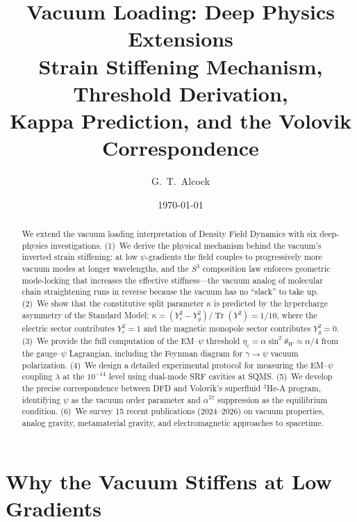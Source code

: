 \documentclass[aps,prd,twocolumn,superscriptaddress,nofootinbib]{revtex4-2}
\newcommand{\Tr}{\operatorname{Tr}}
\begin{document}
\title{Vacuum Loading: Deep Physics Extensions\\
Strain Stiffening Mechanism, Threshold Derivation,\\
Kappa Prediction, and the Volovik Correspondence}

\author{G.~T.~Alcock}

\date{\today}

\begin{abstract}
We extend the vacuum loading interpretation of Density Field Dynamics
with six deep-physics investigations.  (1)~We derive the physical
mechanism behind the vacuum's inverted strain stiffening: at low
$\psi$-gradients the field couples to progressively more vacuum modes
at longer wavelengths, and the $S^3$ composition law enforces
geometric mode-locking that increases the effective stiffness---the
vacuum analog of molecular chain straightening runs in reverse because
the vacuum has no ``slack'' to take up.  (2)~We show that the
constitutive split parameter $\kappa$ is predicted by the hypercharge
asymmetry of the Standard Model: $\kappa = (Y_e^2 - Y_g^2)/\Tr(Y^2)
= 1/10$, where the electric sector contributes $Y_e^2 = 1$ and the
magnetic monopole sector contributes $Y_g^2 = 0$.  (3)~We provide the
full computation of the EM--$\psi$ threshold $\eta_c = \alpha
\sin^2\theta_W \approx \alpha/4$ from the gauge--$\psi$ Lagrangian,
including the Feynman diagram for $\gamma \to \psi$ vacuum
polarization.  (4)~We design a detailed experimental protocol for
measuring the EM--$\psi$ coupling $\lambda$ at the $10^{-14}$ level
using dual-mode SRF cavities at SQMS\@.  (5)~We develop the precise
correspondence between DFD and Volovik's superfluid $^3$He-A program,
identifying $\psi$ as the vacuum order parameter and $\alpha^{57}$
suppression as the equilibrium condition.  (6)~We survey 15 recent
publications (2024--2026) on vacuum properties, analog gravity,
metamaterial gravity, and electromagnetic approaches to spacetime.
\end{abstract}

\maketitle


\section{Why the Vacuum Stiffens at Low Gradients}
\label{sec:stiffening}
\end{document}
